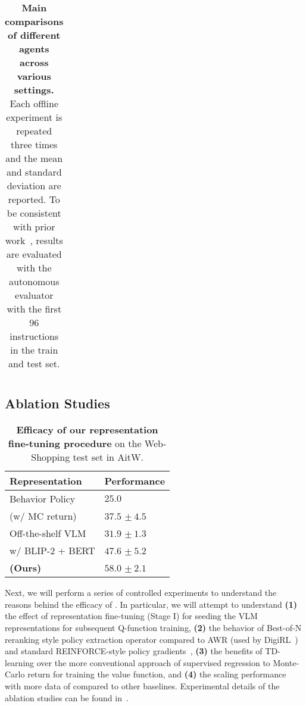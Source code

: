 \begin{table*}[!t]
\begin{tabular}{ccccccc}
        \end{tabular}
        \caption{\footnotesize{\textbf{Main comparisons of different agents across various settings.} Each offline experiment is repeated three times and the mean and standard deviation are reported. To be consistent with prior work~\citep{bai2024digirltraininginthewilddevicecontrol}, results are evaluated with the autonomous evaluator with the first 96 instructions in the train and test set.}}
        \label{tab:main-table}
\end{table*}


\vspace{-0.3cm}
\subsection{Ablation Studies}\label{sec:ablation}
\vspace{-0.2cm}
\begin{wraptable}{r}{0.5\textwidth}
    \centering
    \setlength{\tabcolsep}{5.0pt}
        \begin{tabular}{ll}
\toprule
\textbf{Representation} & \textbf{Performance} \\ 
\midrule
Behavior Policy & $25.0$\\
\midrule
 \ourmethod{} (w/ MC return) & $37.5$ \scriptsize{$ \pm\ 4.5$} \\
\hdashline
\ourmethod{} Off-the-shelf VLM & $31.9$ \scriptsize{$ \pm\ 1.3$} \\
\ourmethod{} w/ BLIP-2 + BERT & $47.6$ \scriptsize{$ \pm\ 5.2$} \\
\hdashline
\textbf{\ourmethod{} (Ours)} & $\mathbf{58.0}$ \scriptsize{$ \pm\ \mathbf{2.1}$} \\ 
\bottomrule
        \end{tabular}
        \caption{\footnotesize{\textbf{Efficacy of our representation fine-tuning procedure} on the Web-Shopping test set in AitW.}}
        \label{tab:exp-novlm}
\end{wraptable}

Next, we will perform a series of controlled experiments to understand the reasons behind the efficacy of \ourmethod{}. In particular, we will attempt to understand \textbf{(1)} the effect of representation fine-tuning (Stage I) for seeding the VLM representations for subsequent Q-function training, \textbf{(2)} the behavior of Best-of-N reranking style policy extraction operator compared to AWR (used by DigiRL~\citep{bai2024digirltraininginthewilddevicecontrol}) and standard REINFORCE-style policy gradients~\citep{williams1992simpleREINFORCE}, \textbf{(3)} the benefits of TD-learning over the more conventional approach of supervised regression to Monte-Carlo return for training the value function, and \textbf{(4)} the scaling performance with more data of \ourmethod{} compared to other baselines. Experimental details of the ablation studies can be found in~.

